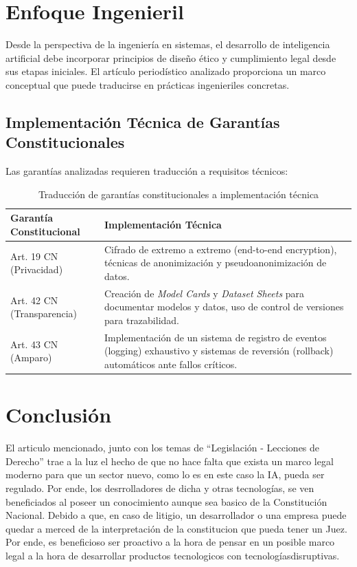 \documentclass[10pt, a4paper]{article}
\begin{document}
\onecolumn %

\section{Enfoque Ingenieril}
\label{sec:enfoque_ingenieril}

Desde la perspectiva de la ingeniería en sistemas, el desarrollo de inteligencia artificial debe incorporar principios de diseño ético y cumplimiento legal desde sus etapas iniciales. El artículo periodístico analizado proporciona un marco conceptual que puede traducirse en prácticas ingenieriles concretas.

\subsection{Implementación Técnica de Garantías Constitucionales}
Las garantías analizadas requieren traducción a requisitos técnicos:

\begin{table}[h]
\centering
\caption{Traducción de garantías constitucionales a implementación técnica}
\begin{tabularx}{\textwidth}{lX}
\toprule
\textbf{Garantía Constitucional} & \textbf{Implementación Técnica} \\
\midrule
Art. 19 CN (Privacidad) & Cifrado de extremo a extremo (end-to-end encryption), técnicas de anonimización y pseudoanonimización de datos. \\
\addlinespace
Art. 42 CN (Transparencia) & Creación de \textit{Model Cards} y \textit{Dataset Sheets} para documentar modelos y datos, uso de control de versiones para trazabilidad. \\
\addlinespace
Art. 43 CN (Amparo) & Implementación de un sistema de registro de eventos (logging) exhaustivo y sistemas de reversión (rollback) automáticos ante fallos críticos. \\
\bottomrule
\end{tabularx}
\end{table}

\section{Conclusión}
\label{sec:conslusion}

El articulo mencionado, junto con los temas de \enquote{Legislación - Lecciones de Derecho} trae a la luz el hecho de que no hace falta que exista un marco legal moderno para que un sector nuevo, como lo es en este caso la IA, pueda ser regulado. Por ende, los desrrolladores de dicha y otras tecnologías, se ven beneficiados al poseer un conocimiento aunque sea basico de la Constitución Nacional. Debido a que, en caso de litigio, un desarrollador o una empresa puede quedar a merced de la interpretación de la constitucion que pueda tener un Juez. 
 Por ende, es beneficioso ser proactivo a la hora de pensar en un posible marco legal a la hora de desarrollar productos tecnologicos con tecnologíasdisruptivas.
\end{document}
